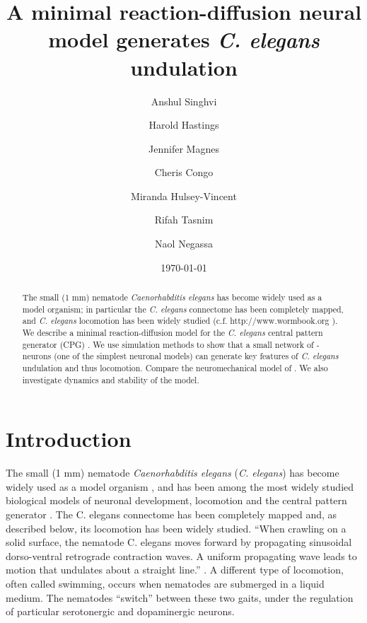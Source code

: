 \documentclass[
    11pt,
    preprint,
    author-numerical,
    aps,
    prl, %
    natbib,
    superscriptaddress,
]{revtex4-2}
\begin{document}

\title{A minimal reaction-diffusion neural model generates {\emph{C. elegans}} undulation}
\author{Anshul Singhvi}
\author{Harold Hastings}
\author{Jennifer Magnes}
\author{Cheris Congo}
\author{Miranda Hulsey-Vincent}
\author{Rifah Tasnim}

\author{Naol Negassa}
\date{\today}
\begin{abstract}
    The small (1 mm) nematode \emph{Caenorhabditis elegans} has become widely used as a model organism; in particular the \emph{C. elegans} connectome has been completely mapped, and \emph{C. elegans} locomotion has been widely studied (c.f. http://www.wormbook.org \citep{corsi2015}). We describe a minimal reaction-diffusion model for the \emph{C. elegans} central pattern generator (CPG) \citep{xu2018,wen2012}. We use simulation methods to show that a small network of \cite{fitzhugh1955}-\cite{nagumo1962} neurons (one of the simplest neuronal models) can generate key features of \emph{C. elegans} undulation \citep[see][]{magnes2012} and thus locomotion. Compare the neuromechanical model of \cite{izquierdo2018}. We also investigate dynamics and stability of the model.
\end{abstract}

\maketitle

\section{Introduction}\label{sec: intro}

The small (1 mm) nematode \emph{Caenorhabditis elegans} (\emph{C. elegans}) has become widely used as a model organism \citep{corsi2015}, and has been among the most widely studied biological models of neuronal development, locomotion and the central pattern generator \citep{katz2016}.
The C. elegans connectome has been completely mapped \citep{jabr} and, as described below, its locomotion has been widely studied.
``When crawling on a solid surface, the nematode C. elegans moves forward by propagating sinusoidal dorso-ventral retrograde contraction waves. A uniform propagating wave leads to motion that undulates about a straight line.'' \citep{kim2011}.
A different type of locomotion, often called swimming, occurs when nematodes are submerged in a liquid medium. The nematodes “switch” between these two gaits, under the regulation of particular serotonergic and dopaminergic neurons.
\end{document}
